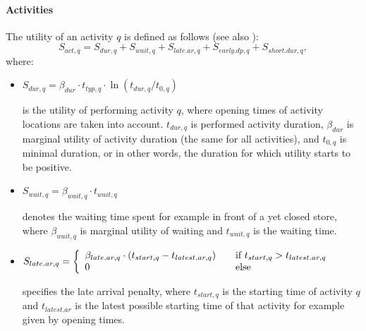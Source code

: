 \paragraph{Activities}

The utility of an activity $q$ is defined as follows (see also \citet[][p.377ff]{CharyparNagel_Transportation_2005}):
\begin{equation}
S_{act,q} = S_{dur,q} + S_{wait,q} + S_{late.ar,q} + S_{early.dp, q} + S_{short.dur, q},
\label{eq:matsimUTFact}
\end{equation}
where:
\begin{itemize}
\item $S_{dur,q}= \beta_{dur} \cdot t_{typ,q} \cdot \ln(t_{dur,q}/t_{0,q})$ 

is the utility of performing activity $q$, where opening times of activity locations are taken into account. $t_{dur,q}$ is performed activity duration, $\beta_{dur}$ is marginal utility of activity duration (the same for all activities),
and $t_{0,q}$ is minimal duration, or in other words, the duration for which utility starts to be positive. 


\item $ S_{wait,q} = \beta_{wait, q} \cdot t_{wait,q}$ 

denotes the waiting time spent for example in front of a yet closed store, where $\beta_{wait,q}$ is marginal utility of waiting and $t_{wait,q}$ is the waiting time.
		
\item $S_{late.ar,q}= \left\{
  \begin{array}{l l}
    \beta_{late.ar,q} \cdot (t_{start,q} - t_{latest.ar,q}) & \quad \text{if $t_{start,q} > t_{latest.ar,q}$}\\
    0 & \quad \text{else}
  \end{array} \right.$
  
  specifies the late arrival penalty, where $t_{start,q}$ is the starting time of activity $q$ and $t_{latest.ar}$ is the latest possible starting time of that activity for example given by opening times.


\end{itemize}
